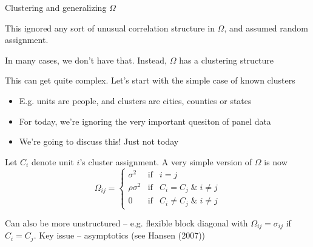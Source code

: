 \documentclass[notes,11pt, aspectratio=169]{beamer}
\newenvironment{wideitemize}{\itemize\addtolength{\itemsep}{10pt}}{\enditemize}
\begin{document}
\begin{frame}{Clustering and generalizing $\Omega$}
  \begin{wideitemize}
  \item   This ignored any sort of unusual correlation structure in $\Omega$, and assumed random assignment.
  \item   In many cases, we don't have that. Instead, $\Omega$  has a clustering structure
  \item This can get quite complex. Let's start with the simple case of known clusters
    \begin{itemize}
    \item E.g. units are people, and clusters are cities, counties or states
    \item For today, we're ignoring the very important quesiton of panel data
    \item We're going to discuss this! Just not today      
    \end{itemize}
  \item Let $C_{i}$ denote unit $i$'s cluster assignment. A very simple version of $\Omega$ is now
    \begin{displaymath}
      \Omega_{ij}  =\left \{\begin{array}{ccc}
                       \sigma^{2} &  \text{if}& i = j\\
                       \rho\sigma^{2}  & \text{if}&  C_{i} = C_{j} \; \& \; i \not= j\\
                       0 & \text{if} & C_{i} \not= C_{j} \; \& \; i \not= j
                     \end{array}\right.
                 \end{displaymath}
               \item Can also be more unstructured -- e.g. flexible
                 block diagonal with $\Omega_{ij} = \sigma_{ij}$ if
                 $C_{i} = C_{j}$.  Key issue -- asymptotics (see
                 Hansen (2007))
  \end{wideitemize}
\end{frame}
\end{document}
